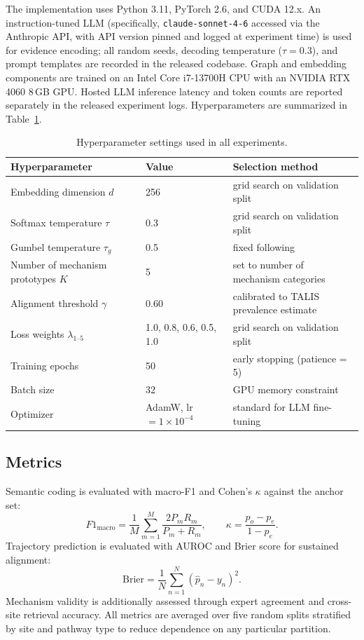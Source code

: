 \documentclass[pdflatex,sn-mathphys-num]{sn-jnl}%
\theoremstyle{thmstyleone}%
\theoremstyle{thmstyletwo}%
\theoremstyle{thmstylethree}%
\begin{document}
The implementation uses Python 3.11, PyTorch 2.6, and CUDA 12.x. An instruction-tuned LLM (specifically, \texttt{claude-sonnet-4-6} accessed via the Anthropic API, with API version pinned and logged at experiment time) is used for evidence encoding; all random seeds, decoding temperature ($\tau = 0.3$), and prompt templates are recorded in the released codebase. Graph and embedding components are trained on an Intel Core i7-13700H CPU with an NVIDIA RTX 4060 8\,GB GPU. Hosted LLM inference latency and token counts are reported separately in the released experiment logs. Hyperparameters are summarized in Table~\ref{tab:hyperparams}.

\begin{table}[t]
\centering
\caption{Hyperparameter settings used in all experiments.}
\label{tab:hyperparams}
\begin{tabular}{lll}
\toprule
Hyperparameter & Value & Selection method\\
\midrule
Embedding dimension $d$ & 256 & grid search on validation split\\
Softmax temperature $\tau$ & 0.3 & grid search on validation split\\
Gumbel temperature $\tau_g$ & 0.5 & fixed following \cite{jang2016gumbel}\\
Number of mechanism prototypes $K$ & 5 & set to number of mechanism categories\\
Alignment threshold $\gamma$ & 0.60 & calibrated to TALIS prevalence estimate\\
Loss weights $\lambda_{1\text{--}5}$ & 1.0, 0.8, 0.6, 0.5, 1.0 & grid search on validation split\\
Training epochs & 50 & early stopping (patience = 5)\\
Batch size & 32 & GPU memory constraint\\
Optimizer & AdamW, lr $= 1\times10^{-4}$ & standard for LLM fine-tuning\\
\bottomrule
\end{tabular}
\end{table}

\subsection{Metrics}

Semantic coding is evaluated with macro-F1 and Cohen's $\kappa$ against the anchor set:
\[
F1_{\mathrm{macro}}=\frac{1}{M}\sum_{m=1}^{M}\frac{2P_mR_m}{P_m+R_m},
\qquad
\kappa=\frac{p_o-p_e}{1-p_e}.
\]
Trajectory prediction is evaluated with AUROC and Brier score for sustained alignment:
\[
\mathrm{Brier}=\frac{1}{N}\sum_{n=1}^{N}(\hat{p}_n-y_n)^2.
\]
Mechanism validity is additionally assessed through expert agreement and cross-site retrieval accuracy. All metrics are averaged over five random splits stratified by site and pathway type to reduce dependence on any particular partition.
\end{document}
